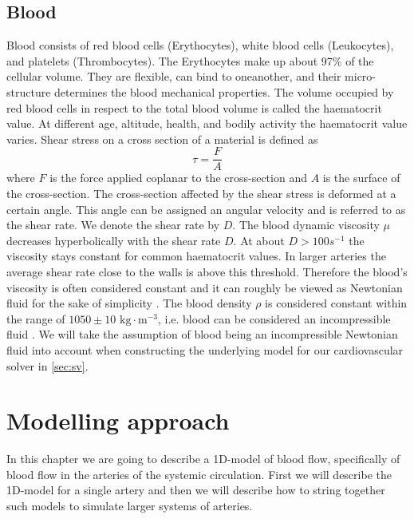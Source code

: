 \documentclass[a4paper, oneside]{discothesis}
\begin{document}
\section{Blood} \label{b}
Blood consists of red blood cells (Erythocytes), white blood cells (Leukocytes), and platelets (Thrombocytes).
The Erythocytes make up about 97\% of the cellular volume.
They are flexible, can bind to oneanother, and their micro-structure determines the blood mechanical properties.
The volume occupied by red blood cells in respect to the total blood volume is called the haematocrit value.
At different age, altitude, health, and bodily activity the haematocrit value varies.
Shear stress on a cross section of a material is defined as 
\begin{equation}
	\tau = \frac{F}{A}
\end{equation}
where $F$ is the force applied coplanar to the cross-section and $A$ is the surface of the cross-section.
The cross-section affected by the shear stress is deformed at a certain angle. 
This angle can be assigned an angular velocity and is referred to as the shear rate.
We denote the shear rate by $D$. \cite{köppl2023dimension}
The blood dynamic viscosity $\mu$ decreases hyperbolically with the shear rate $D$.
At about $D > 100s^{-1}$ the viscosity stays constant for common haematocrit values.
In larger arteries the average shear rate close to the walls is above this threshold. \cite{MCDbook}
Therefore the blood's viscosity is often considered constant and it can roughly be viewed as Newtonian fluid for the sake of simplicity \cite{fung1996biomechanics,guyton2006textbook,MCDbook,pedley_1980,zamir2000physics,zamir2006physics}. 
The blood density $\rho$ is considered constant within the range of $1050 \pm 10 \text{ kg}\cdot\text{m}^{-3}$, i.e. blood can be considered an incompressible fluid \cite{PMID:2658951,kenner1977continuous,helmig1997multiphase}.
We will take the assumption of blood being an incompressible Newtonian fluid into account when constructing the underlying model for our cardiovascular solver in \autoref{sec:sv}.

\chapter{Modelling approach} \label{chap:1dm}
In this chapter we are going to describe a 1D-model of blood flow, specifically of blood flow in the arteries of the systemic circulation.
First we will describe the 1D-model for a single artery and then we will describe how to string together such models to simulate larger systems of arteries.
\end{document}

